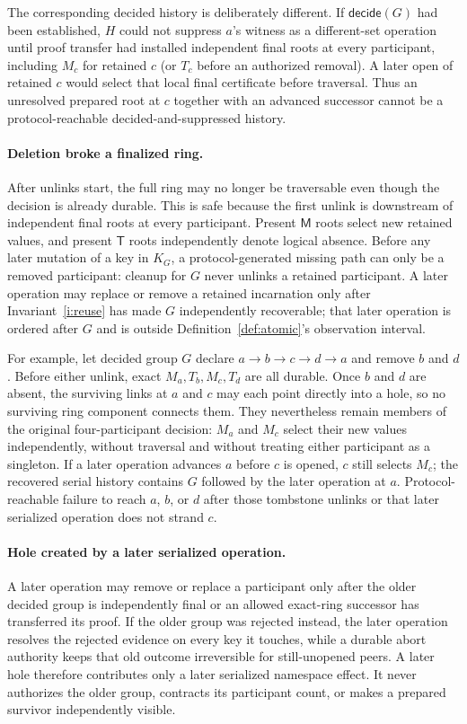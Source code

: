 \documentclass[10pt,twocolumn]{article}
\theoremstyle{remark}
\newcommand{\Materialized}{\mathsf{M}}
\newcommand{\Tombstone}{\mathsf{T}}
\begin{document}
The corresponding decided history is deliberately different. If $\mathsf{decide}(G)$ had been
established, $H$ could not suppress $a$'s witness as a different-set operation until proof transfer
had installed independent final roots at every participant, including $M_c$ for retained $c$ (or
$T_c$ before an authorized removal). A later open of retained $c$ would select that local final
certificate before traversal. Thus an unresolved prepared root at $c$ together with an advanced
successor cannot be a protocol-reachable decided-and-suppressed history.

\paragraph{Deletion broke a finalized ring.}
After unlinks start, the full ring may no longer be traversable even though the decision is already
durable. This is safe because the first unlink is downstream of independent final roots at every
participant. Present $\Materialized$ roots select new retained values, and present $\Tombstone$
roots independently denote logical absence. Before any later mutation of a key in $K_G$, a
protocol-generated missing path can only be a removed participant: cleanup for $G$ never unlinks a
retained participant. A later operation may replace or remove a retained incarnation only after
Invariant~\ref{i:reuse} has made $G$ independently recoverable; that later operation is ordered
after $G$ and is outside Definition~\ref{def:atomic}'s observation interval.

For example, let decided group $G$ declare $a\to b\to c\to d\to a$ and remove $b$ and $d$.
Before either unlink, exact $M_a,T_b,M_c,T_d$ are all durable. Once $b$ and $d$ are absent, the
surviving links at $a$ and $c$ may each point directly into a hole, so no surviving ring component
connects them. They nevertheless remain members of the original four-participant decision: $M_a$
and $M_c$ select their new values independently, without traversal and without treating either
participant as a singleton. If a later operation advances $a$ before $c$ is opened, $c$ still
selects $M_c$; the recovered serial history contains $G$ followed by the later operation at $a$.
Protocol-reachable failure to reach $a$, $b$, or $d$ after those tombstone unlinks or that later
serialized operation does not strand $c$.

\paragraph{Hole created by a later serialized operation.}
A later operation may remove or replace a participant only after the older decided group is
independently final or an allowed exact-ring successor has transferred its proof. If the older group
was rejected instead, the later operation resolves the rejected evidence on every key it touches,
while a durable abort authority keeps that old outcome irreversible for still-unopened peers. A
later hole therefore contributes only a later serialized namespace effect. It never authorizes the
older group, contracts its participant count, or makes a prepared survivor independently visible.
\end{document}
